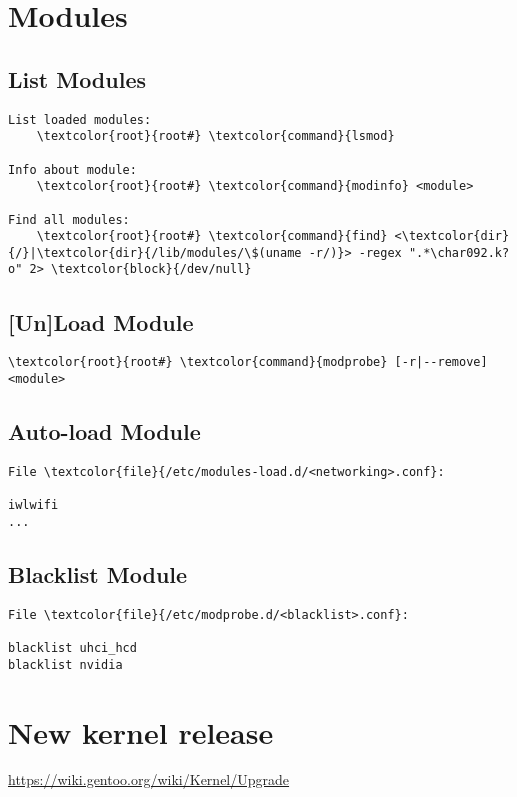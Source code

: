 \documentclass[10pt, a4paper, onecolumn, openany]{book}         %
\begin{document}
\section{Modules}
\subsection{List Modules}
\begin{Verbatim}[commandchars=\\\{\}]
List loaded modules:
    \textcolor{root}{root#} \textcolor{command}{lsmod}

Info about module:
    \textcolor{root}{root#} \textcolor{command}{modinfo} <module>
    
Find all modules:
    \textcolor{root}{root#} \textcolor{command}{find} <\textcolor{dir}{/}|\textcolor{dir}{/lib/modules/\$(uname -r/)}> -regex ".*\char092.k?o" 2> \textcolor{block}{/dev/null}
\end{Verbatim}

\subsection{[Un]Load Module}
\begin{Verbatim}[commandchars=\\\{\}]
    \textcolor{root}{root#} \textcolor{command}{modprobe} [-r|--remove] <module>
\end{Verbatim}

\subsection{Auto-load Module}
\begin{Verbatim}[commandchars=\\\{\}]
File \textcolor{file}{/etc/modules-load.d/<networking>.conf}:

iwlwifi
...
\end{Verbatim}
\subsection{Blacklist Module}
\begin{Verbatim}[commandchars=\\\{\}]
File \textcolor{file}{/etc/modprobe.d/<blacklist>.conf}:

blacklist uhci_hcd
blacklist nvidia
\end{Verbatim}


\section{New kernel release}
\underline{\url{https://wiki.gentoo.org/wiki/Kernel/Upgrade}}
\end{document}
